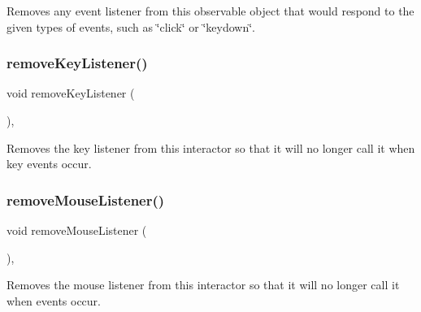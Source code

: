 Removes any event listener from this observable object that would respond to the given types of events, such as \char`\"{}click\char`\"{} or \char`\"{}keydown\char`\"{}. 

\mbox{\label{classsgl_1_1GInteractor_a43095f41cab3be732b49f29970484b05}} 
\subsubsection{\texorpdfstring{remove\+Key\+Listener()}{removeKeyListener()}}
{\footnotesize\ttfamily void remove\+Key\+Listener (\begin{DoxyParamCaption}{ }\end{DoxyParamCaption})\hspace{0.3cm}{\ttfamily [virtual]}, {\ttfamily [inherited]}}



Removes the key listener from this interactor so that it will no longer call it when key events occur. 

\mbox{\label{classsgl_1_1GInteractor_aff47f71ce47e688a07c9d38dc92fcc11}} 
\subsubsection{\texorpdfstring{remove\+Mouse\+Listener()}{removeMouseListener()}}
{\footnotesize\ttfamily void remove\+Mouse\+Listener (\begin{DoxyParamCaption}{ }\end{DoxyParamCaption})\hspace{0.3cm}{\ttfamily [virtual]}, {\ttfamily [inherited]}}



Removes the mouse listener from this interactor so that it will no longer call it when events occur. 

\mbox{\label{classsgl_1_1GInteractor_a519fb2ac767f8b2febbb50b898b8c8cb}} 
